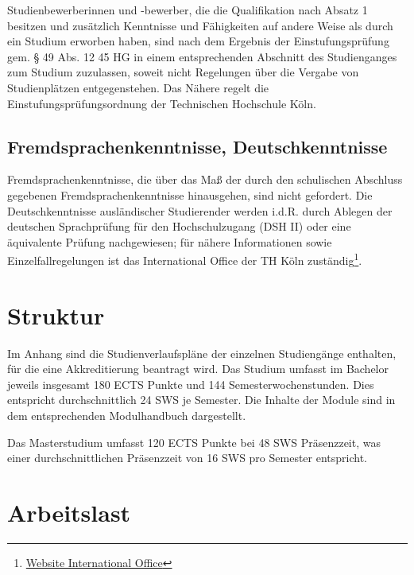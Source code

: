 Studienbewerberinnen und -bewerber, die die Qualifikation nach Absatz 1
besitzen und zusätzlich Kenntnisse und Fähigkeiten auf andere Weise als
durch ein Studium erworben haben, sind nach dem Ergebnis der
Einstufungsprüfung gem. § 49 Abs. 12 45 HG in einem entsprechenden
Abschnitt des Studienganges zum Studium zuzulassen, soweit nicht
Regelungen über die Vergabe von Studienplätzen entgegenstehen. Das
Nähere regelt die Einstufungsprüfungsordnung der Technischen Hochschule
Köln.

\subsection{Fremdsprachenkenntnisse,
Deutschkenntnisse\label{/mi-2017/selbstbericht/0500-studierbarkeit/0000-studierbarkeit}}\label{fremdsprachenkenntnisse-deutschkenntnissepathlabelmi-2017selbstbericht0500-studierbarkeit0000-studierbarkeit-1}

Fremdsprachenkenntnisse, die über das Maß der durch den schulischen
Abschluss gegebenen Fremdsprachenkenntnisse hinausgehen, sind nicht
gefordert. Die Deutschkenntnisse ausländischer Studierender werden
i.d.R. durch Ablegen der deutschen Sprachprüfung für den Hochschulzugang
(DSH II) oder eine äquivalente Prüfung nachgewiesen; für nähere
Informationen sowie Einzelfallregelungen ist das International Office
der TH Köln zuständig\footnote{\href{https://www.th-koeln.de/internationales/international-office_1986.php}{Website
  International Office}}.

\section{Struktur\label{/mi-2017/selbstbericht/0500-studierbarkeit/0000-studierbarkeit}}\label{strukturpathlabelmi-2017selbstbericht0500-studierbarkeit0000-studierbarkeit}

Im Anhang sind die Studienverlaufspläne der einzelnen Studiengänge
enthalten, für die eine Akkreditierung beantragt wird. Das Studium
umfasst im Bachelor jeweils insgesamt 180 ECTS Punkte und 144
Semesterwochenstunden. Dies entspricht durchschnittlich 24 SWS je
Semester. Die Inhalte der Module sind in dem entsprechenden
Modulhandbuch dargestellt.

Das Masterstudium umfasst 120 ECTS Punkte bei 48 SWS Präsenzzeit, was
einer durchschnittlichen Präsenzzeit von 16 SWS pro Semester entspricht.

\section{Arbeitslast\label{/mi-2017/selbstbericht/0500-studierbarkeit/0000-studierbarkeit}}\label{arbeitslastpathlabelmi-2017selbstbericht0500-studierbarkeit0000-studierbarkeit}

